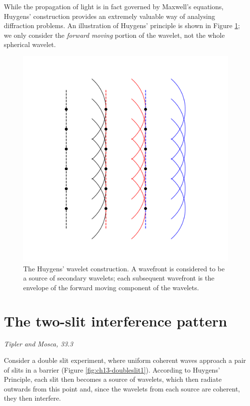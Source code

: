 \documentclass[
]{book}
\begin{document}
While the propagation of light is in fact governed by Maxwell's equations, Huygens' construction provides an extremely valuable way of analysing diffraction problems. An illustration of Huygens' principle is shown in Figure \ref{fig:ch13-huygenswavelets1}; we only consider the \emph{forward moving} portion of the wavelet, not the whole spherical wavelet.

\begin{figure}

{\centering \includegraphics[width=0.7\linewidth]{visualisations/ch13-huygenswavelets1} 

}

\caption{The Huygens' wavelet construction. A wavefront is considered to be a source of secondary wavelets; each subsequent wavefront is the envelope of the forward moving component of the wavelets.}\label{fig:ch13-huygenswavelets1}
\end{figure}

\hypertarget{sec:ch13-twoslitinterference}{%
\section{The two-slit interference pattern}\label{sec:ch13-twoslitinterference}}

\emph{Tipler and Mosca, 33.3}

Consider a double slit experiment, where uniform coherent waves approach a pair of slits in a barrier (Figure \ref{fig:ch13-doubleslit1}). According to Huygens' Principle, each slit then becomes a source of wavelets, which then radiate outwards from this point and, since the wavelets from each source are coherent, they then interfere.
\end{document}
